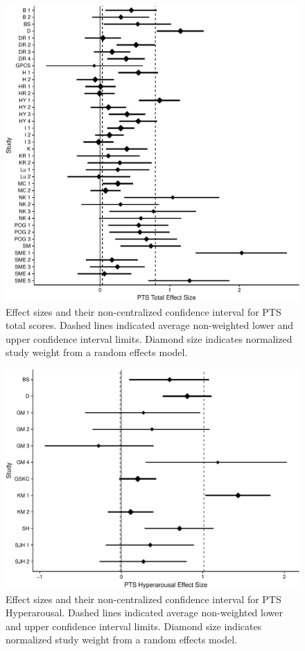 \documentclass[english,man]{apa6}
\theoremstyle{definition}
\theoremstyle{definition}
\theoremstyle{definition}
\theoremstyle{remark}
\begin{document}
\begin{figure}
\centering
\includegraphics{meta_markdown_files/figure-latex/ptspicoverall-1.pdf}
\caption{\label{fig:ptspicoverall}Effect sizes and their non-centralized
confidence interval for PTS total scores. Dashed lines indicated average
non-weighted lower and upper confidence interval limits. Diamond size
indicates normalized study weight from a random effects model.}
\end{figure}

\begin{figure}
\centering
\includegraphics{meta_markdown_files/figure-latex/ptspichyper-1.pdf}
\caption{\label{fig:ptspichyper}Effect sizes and their non-centralized
confidence interval for PTS Hyperarousal. Dashed lines indicated average
non-weighted lower and upper confidence interval limits. Diamond size
indicates normalized study weight from a random effects model.}
\end{figure}
\end{document}
